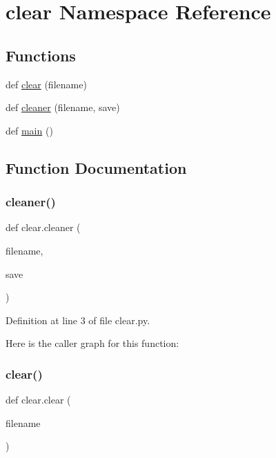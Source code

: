 \hypertarget{namespaceclear}{}\section{clear Namespace Reference}
\label{namespaceclear}
\subsection*{Functions}
\begin{DoxyCompactItemize}
\item 
def \hyperlink{namespaceclear_add3908c17a1ba001f9990e90300fed76}{clear} (filename)
\item 
def \hyperlink{namespaceclear_a9f462934d938ec7c54c708066c25ba13}{cleaner} (filename, save)
\item 
def \hyperlink{namespaceclear_a7c020f5885bae20fb99d2120b41869e9}{main} ()
\end{DoxyCompactItemize}


\subsection{Function Documentation}
\mbox{\label{namespaceclear_a9f462934d938ec7c54c708066c25ba13}} 
\subsubsection{\texorpdfstring{cleaner()}{cleaner()}}
{\footnotesize\ttfamily def clear.\+cleaner (\begin{DoxyParamCaption}\item[{}]{filename,  }\item[{}]{save }\end{DoxyParamCaption})}



Definition at line 3 of file clear.\+py.

Here is the caller graph for this function\+:
\mbox{\label{namespaceclear_add3908c17a1ba001f9990e90300fed76}} 
\subsubsection{\texorpdfstring{clear()}{clear()}}
{\footnotesize\ttfamily def clear.\+clear (\begin{DoxyParamCaption}\item[{}]{filename }\end{DoxyParamCaption})}



